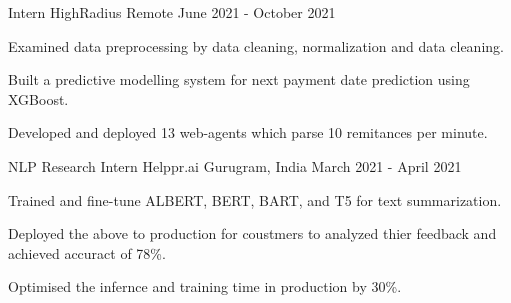 \begin{cventries}
  \cventry
    {Intern} %
    {HighRadius} %
    {Remote} %
    {June 2021 - October 2021} %
    {
      \begin{cvitems} %
        \item {Examined data preprocessing by data cleaning, normalization and data cleaning.}
        \item {Built a predictive modelling system for next payment date prediction using XGBoost.}
        \item {Developed and deployed 13 web-agents which parse 10 remitances per minute.}
      \end{cvitems}
    }


  \cventry
    {NLP Research Intern} %
    {Helppr.ai} %
    {Gurugram, India} %
    {March 2021 - April 2021} %
    {
      \begin{cvitems} %
        \item {Trained and fine-tune ALBERT, BERT, BART, and T5 for text summarization.}
        \item {Deployed the above to production for coustmers to analyzed thier feedback and achieved accuract of 78\%.}
        \item {Optimised the infernce and training time in production by 30\%.}
      \end{cvitems}
    }

\end{cventries}
